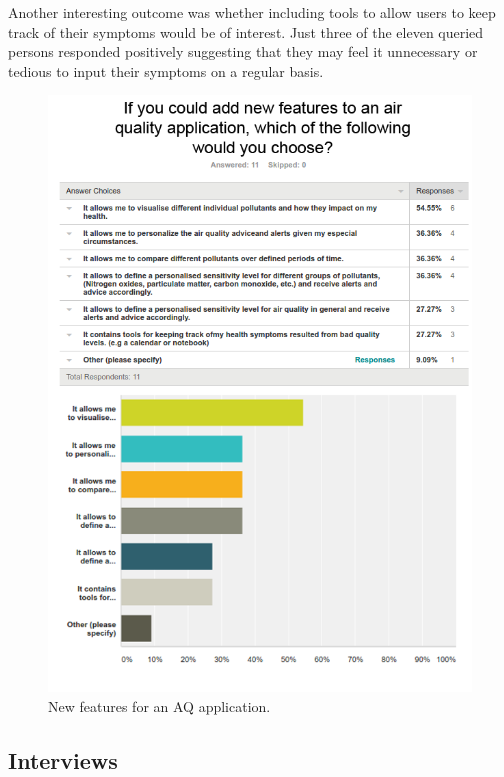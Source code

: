 Another interesting outcome was whether including tools to allow users to keep track of their symptoms would be of interest. Just three of the eleven queried persons responded positively suggesting that they may feel it unnecessary or tedious to input their symptoms on a regular basis.


\begin{figure}[H]
\begin{adjustbox}{width=1\textwidth,center=\textwidth}
  \centering
  \includegraphics[scale=1]{images/new_features.png}
\end{adjustbox}
  \caption[New features for an AQ application]{New features for an AQ application.}
  \label{fig:survey_new_features}
\end{figure}

\subsection{Interviews}
 
